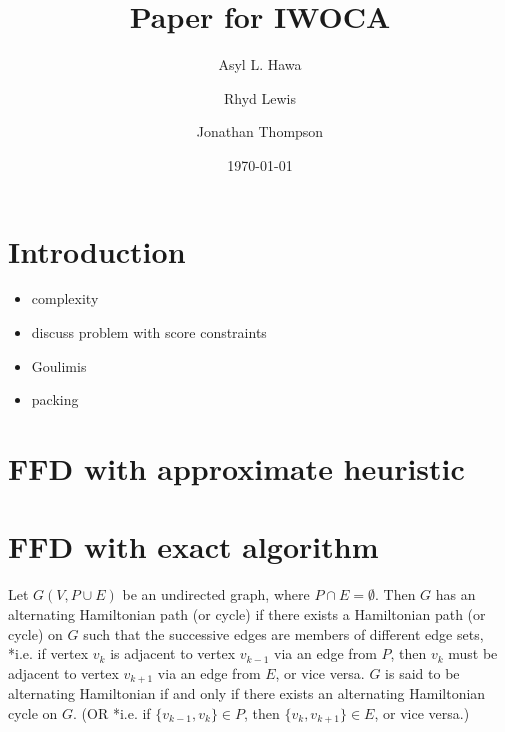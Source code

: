 \documentclass{llncs}
\title{Paper for IWOCA}
\author{Asyl L. Hawa \and Rhyd Lewis \and Jonathan Thompson}
\institute{School of Mathematics, Cardiff University, Senghennydd Road, Cardiff, UK, CF24 4AG}
\date{\today}
\begin{document}
\maketitle

\section{Introduction}
\begin{itemize}
	\item complexity
\end{itemize}

\begin{itemize}
	\item discuss problem with score constraints
	\item Goulimis
	\item packing
\end{itemize}

\section{FFD with approximate heuristic}

\section{FFD with exact algorithm}
\begin{definition}
	Let $G(V,P\cup E)$ be an undirected graph, where $P \cap E = \emptyset$. Then $G$ has an alternating Hamiltonian path (or cycle) if there exists a Hamiltonian path (or cycle) on $G$ such that the successive edges are members of different edge sets, *i.e. if vertex $v_k$ is adjacent to vertex $v_{k-1}$ via an edge from $P$, then $v_k$ must be adjacent to vertex $v_{k+1}$ via an edge from $E$, or vice versa. $G$ is said to be alternating Hamiltonian if and only if there exists an alternating Hamiltonian cycle on $G$. (OR *i.e. if $\{v_{k-1}, v_k\} \in P$, then $\{v_k, v_{k+1}\} \in E$, or vice versa.)
\end{definition}
\end{document}
